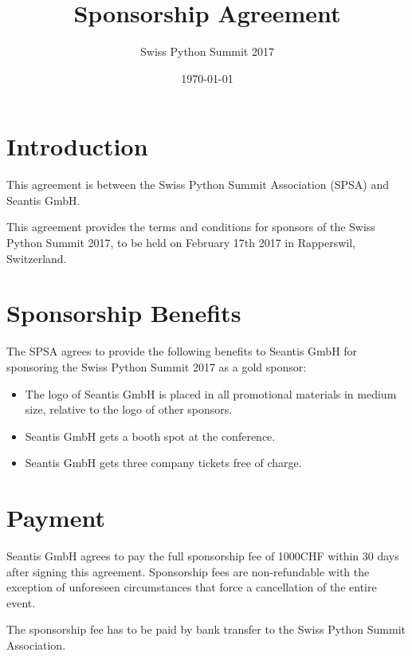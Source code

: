 \documentclass[11pt,enlargefirstpage=true,headlines=4]{scrartcl}
\title{Sponsorship Agreement}
\subtitle{Swiss Python Summit 2017}
\date{\today} %
\begin{document}
    \maketitle

    \section{Introduction}

    This agreement is between the Swiss Python Summit Association (SPSA) and
    Seantis GmbH.

    This agreement provides the terms and conditions for sponsors of the Swiss
    Python Summit 2017, to be held on February 17th 2017 in Rapperswil,
    Switzerland.

    \section{Sponsorship Benefits}

    The SPSA agrees to provide the following benefits to Seantis GmbH for sponsoring
    the Swiss Python Summit 2017 as a gold sponsor:

    \begin{itemize}
        \item The logo of Seantis GmbH is placed in all promotional materials in medium size, relative to the logo of other sponsors.
        \item Seantis GmbH gets a booth spot at the conference.
        \item Seantis GmbH gets three company tickets free of charge.
    \end{itemize}

    \section{Payment}

    Seantis GmbH agrees to pay the full sponsorship fee of 1000CHF within 30 days
    after signing this agreement. Sponsorship fees are non‐refundable with the
    exception of unforeseen circumstances that force a cancellation of the entire
    event.

    The sponsorship fee has to be paid by bank transfer to the Swiss Python
    Summit Association.

    \quad
\end{document}
